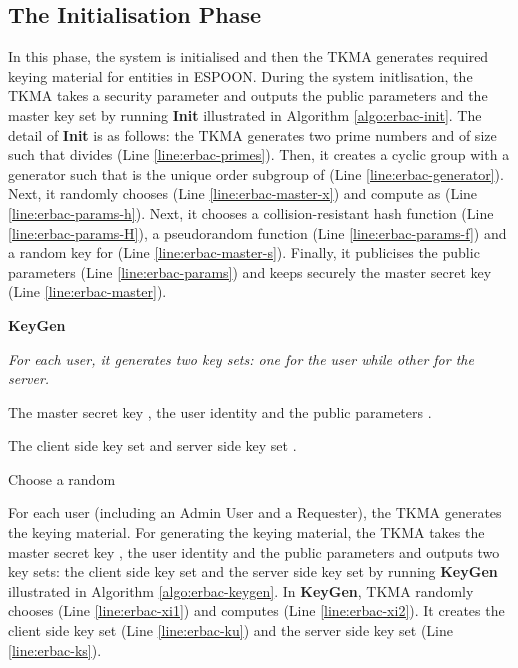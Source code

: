 \documentclass[epsfig,a4paper,11pt,titlepage]{book}
\numberwithin{algorithm}{chapter}
\newcommand{\algofontsize}{\fontsize{11}{12}\selectfont}
\begin{document}
\subsection{The Initialisation Phase}

In this phase, the system is initialised and then the \gls{TKMA} generates required keying material for entities in \gls{ESPOON}. During the system initlisation, the \gls{TKMA} takes a security parameter  and outputs the public parameters  and the master key set  by running \textbf{Init} illustrated in Algorithm \ref{algo:erbac-init}. The detail of \textbf{Init} is as follows: the \gls{TKMA} generates two prime numbers  and  of size  such that  divides  (Line \ref{line:erbac-primes}). Then, it creates a cyclic group  with a generator  such that  is the unique order  subgroup of  (Line \ref{line:erbac-generator}). Next, it randomly chooses  (Line \ref{line:erbac-master-x}) and compute  as  (Line \ref{line:erbac-params-h}). Next, it chooses a collision-resistant hash function  (Line \ref{line:erbac-params-H}), a pseudorandom function  (Line \ref{line:erbac-params-f}) and a random key  for  (Line \ref{line:erbac-master-s}). Finally, it publicises the public parameters  (Line \ref{line:erbac-params}) and keeps securely the master secret key  (Line \ref{line:erbac-master}).



\begin{algorithm} [htp]
{\algofontsize
\caption{\textbf{KeyGen}}

\label{algo:erbac-keygen}

\begin{algorithmic}[1]

\INPUT \emph{For each user, it generates two key sets: one for the user while other for the server.}

\Require The master secret key , the user identity  and the public parameters .

\Ensure The client side key set  and server side key set .

\medskip

\State Choose a random  \label{line:erbac-xi1}
\State  \label{line:erbac-xi2}
\State  \label{line:erbac-ku}
\State  \label{line:erbac-ks}

\Return 

\end{algorithmic}
}
\end{algorithm}

For each user (including an Admin User and a Requester), the \gls{TKMA} generates the keying material. For generating the keying material, the \gls{TKMA} takes the master secret key , the user identity  and the public parameters  and outputs two key sets: the client side key set  and the server side key set  by running \textbf{KeyGen} illustrated in Algorithm \ref{algo:erbac-keygen}. In \textbf{KeyGen}, \gls{TKMA} randomly chooses  (Line \ref{line:erbac-xi1}) and computes  (Line \ref{line:erbac-xi2}). It creates the client side key set  (Line \ref{line:erbac-ku}) and the server side key set  (Line \ref{line:erbac-ks}).
\end{document}
